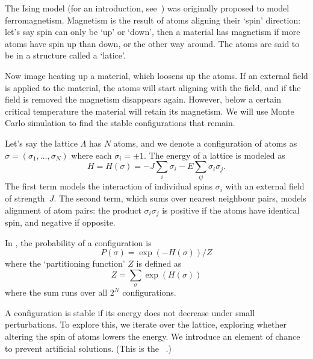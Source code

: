 
The Ising model (for an introduction, see~\cite{Cipra:Ising}) was
originally proposed to model ferromagnetism. Magnetism is the result
of atoms aligning their `spin' direction: let's say spin can only be
`up' or `down', then a material has magnetism if more atoms have spin
up than down, or the other way around. The atoms are said to be in a
structure called a `latice'.

Now image heating up a material, which loosens up the atoms. If an
external field is applied to the material, the atoms will start
aligning with the field, and if the field is removed the magnetism
disappears again. However, below a certain critical temperature the
material will retain its magnetism.
We will use Monte Carlo simulation to find the stable configurations
that remain.

Let's say the lattice $\Lambda$ has $N$ atoms, and we denote a
configuration of atoms as $\sigma=(\sigma_1,\ldots,\sigma_N)$ where
each $\sigma_i=\pm1$.
The energy of a lattice is modeled as
\[ H=H(\sigma)=-J\sum_i\sigma_i-E\sum_{ij}\sigma_i\sigma_j. \]
The first term models the interaction of individual spins $\sigma_i$
with an external field of strength~$J$. The second term, which sums
over nearest neighbour pairs, models
alignment of atom pairs: the product $\sigma_i\sigma_j$ is positive if
the atoms have identical spin, and negative if opposite.

In , the probability of a
configuration is 
\[ P(\sigma) = \exp(-H(\sigma))/Z \]
where the `partitioning function' $Z$ is defined as 
\[ Z = \sum_\sigma \exp(H(\sigma)) \]
where the sum runs over all $2^N$ configurations.

A configuration is stable if its energy does not decrease under small
perturbations. To explore this, we iterate over the lattice, exploring
whether altering the spin of atoms lowers the energy. We introduce an
element of chance to prevent artificial solutions. (This is the
~\cite{Metropolis}.)

